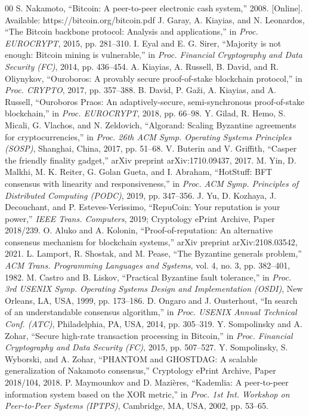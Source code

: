 \documentclass[conference]{IEEEtran}
\begin{document}
\begin{thebibliography}{00}
 S. Nakamoto, ``Bitcoin: A peer-to-peer electronic cash system,'' 2008. [Online]. Available: https://bitcoin.org/bitcoin.pdf
 J. Garay, A. Kiayias, and N. Leonardos, ``The Bitcoin backbone protocol: Analysis and applications,'' in \textit{Proc. EUROCRYPT}, 2015, pp. 281--310.
 I. Eyal and E. G. Sirer, ``Majority is not enough: Bitcoin mining is vulnerable,'' in \textit{Proc. Financial Cryptography and Data Security (FC)}, 2014, pp. 436--454.
 A. Kiayias, A. Russell, B. David, and R. Oliynykov, ``Ouroboros: A provably secure proof-of-stake blockchain protocol,'' in \textit{Proc. CRYPTO}, 2017, pp. 357--388.
 B. David, P. Ga\v{z}i, A. Kiayias, and A. Russell, ``Ouroboros Praos: An adaptively-secure, semi-synchronous proof-of-stake blockchain,'' in \textit{Proc. EUROCRYPT}, 2018, pp. 66--98.
 Y. Gilad, R. Hemo, S. Micali, G. Vlachos, and N. Zeldovich, ``Algorand: Scaling Byzantine agreements for cryptocurrencies,'' in \textit{Proc. 26th ACM Symp. Operating Systems Principles (SOSP)}, Shanghai, China, 2017, pp. 51--68.
 V. Buterin and V. Griffith, ``Casper the friendly finality gadget,'' arXiv preprint arXiv:1710.09437, 2017.
 M. Yin, D. Malkhi, M. K. Reiter, G. Golan Gueta, and I. Abraham, ``HotStuff: BFT consensus with linearity and responsiveness,'' in \textit{Proc. ACM Symp. Principles of Distributed Computing (PODC)}, 2019, pp. 347--356.
 J. Yu, D. Kozhaya, J. Decouchant, and P. Esteves-Verissimo, ``RepuCoin: Your reputation is your power,'' \textit{IEEE Trans. Computers}, 2019; Cryptology ePrint Archive, Paper 2018/239.
 O. Aluko and A. Kolonin, ``Proof-of-reputation: An alternative consensus mechanism for blockchain systems,'' arXiv preprint arXiv:2108.03542, 2021.
 L. Lamport, R. Shostak, and M. Pease, ``The Byzantine generals problem,'' \textit{ACM Trans. Programming Languages and Systems}, vol. 4, no. 3, pp. 382--401, 1982.
 M. Castro and B. Liskov, ``Practical Byzantine fault tolerance,'' in \textit{Proc. 3rd USENIX Symp. Operating Systems Design and Implementation (OSDI)}, New Orleans, LA, USA, 1999, pp. 173--186.
 D. Ongaro and J. Ousterhout, ``In search of an understandable consensus algorithm,'' in \textit{Proc. USENIX Annual Technical Conf. (ATC)}, Philadelphia, PA, USA, 2014, pp. 305--319.
 Y. Sompolinsky and A. Zohar, ``Secure high-rate transaction processing in Bitcoin,'' in \textit{Proc. Financial Cryptography and Data Security (FC)}, 2015, pp. 507--527.
 Y. Sompolinsky, S. Wyborski, and A. Zohar, ``PHANTOM and GHOSTDAG: A scalable generalization of Nakamoto consensus,'' Cryptology ePrint Archive, Paper 2018/104, 2018.
 P. Maymounkov and D. Mazi\`eres, ``Kademlia: A peer-to-peer information system based on the XOR metric,'' in \textit{Proc. 1st Int. Workshop on Peer-to-Peer Systems (IPTPS)}, Cambridge, MA, USA, 2002, pp. 53--65.
\end{thebibliography}
\end{document}

